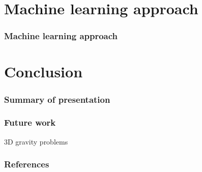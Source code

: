 \documentclass{beamer}
\begin{document}
\section{Machine learning approach}

\begin{frame}
\frametitle{Machine learning approach}

\end{frame}

\section{Conclusion}

\begin{frame}
\frametitle{Summary of presentation}

\end{frame}

\begin{frame}
\frametitle{Future work}
3D gravity problems
\end{frame}

\begin{frame}[allowframebreaks]
\frametitle{References}


\end{frame}
\end{document}
